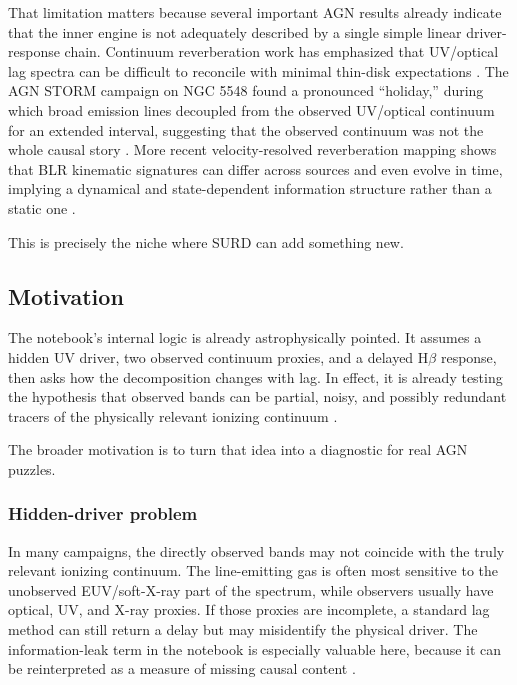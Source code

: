 \documentclass{article}
\begin{document}
That limitation matters because several important AGN results already indicate that the inner engine is not adequately described by a single simple linear driver-response chain. Continuum reverberation work has emphasized that UV/optical lag spectra can be difficult to reconcile with minimal thin-disk expectations \cite{Korista2014}. The AGN STORM campaign on NGC 5548 found a pronounced ``holiday,'' during which broad emission lines decoupled from the observed UV/optical continuum for an extended interval, suggesting that the observed continuum was not the whole causal story \cite{Dehghanian2019}. More recent velocity-resolved reverberation mapping shows that BLR kinematic signatures can differ across sources and even evolve in time, implying a dynamical and state-dependent information structure rather than a static one \cite{LuEtAl2022,FengEtAl2024,FengEtAl2021}.

This is precisely the niche where SURD can add something new.

\subsection{Motivation}

The notebook's internal logic is already astrophysically pointed. It assumes a hidden UV driver, two observed continuum proxies, and a delayed H$\beta$ response, then asks how the decomposition changes with lag. In effect, it is already testing the hypothesis that observed bands can be partial, noisy, and possibly redundant tracers of the physically relevant ionizing continuum \cite{AGN_SURD_notebook}.

The broader motivation is to turn that idea into a diagnostic for real AGN puzzles.

\subsubsection{Hidden-driver problem}

In many campaigns, the directly observed bands may not coincide with the truly relevant ionizing continuum. The line-emitting gas is often most sensitive to the unobserved EUV/soft-X-ray part of the spectrum, while observers usually have optical, UV, and X-ray proxies. If those proxies are incomplete, a standard lag method can still return a delay but may misidentify the physical driver. The information-leak term in the notebook is especially valuable here, because it can be reinterpreted as a measure of missing causal content \cite{AGN_SURD_notebook}.
\end{document}
